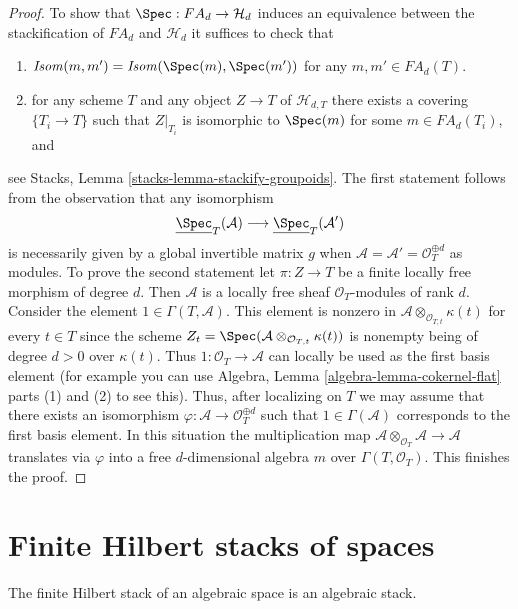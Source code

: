 \begin{proof}
\medskip\noindent
To show that $\Spec : FA_d \to \mathcal{H}_d$ induces an equivalence
between the stackification of $FA_d$ and $\mathcal{H}_d$ it suffices to
check that
\begin{enumerate}
\item $\mathit{Isom}(m, m') = \mathit{Isom}(\Spec(m), \Spec(m'))$
for any $m, m' \in FA_d(T)$.
\item for any scheme $T$ and any object $Z \to T$ of $\mathcal{H}_{d, T}$
there exists a covering $\{T_i \to T\}$ such that $Z|_{T_i}$ is
isomorphic to $\Spec(m)$ for some $m \in FA_d(T_i)$, and
\end{enumerate}
see
Stacks, Lemma \ref{stacks-lemma-stackify-groupoids}.
The first statement follows from the observation that any isomorphism
$$
\underline{\Spec}_T(\mathcal{A})
\longrightarrow
\underline{\Spec}_T(\mathcal{A}')
$$
is necessarily given by a global invertible matrix $g$ when
$\mathcal{A} = \mathcal{A}' = \mathcal{O}_T^{\oplus d}$ as modules.
To prove the second statement let $\pi : Z \to T$ be a finite
locally free morphism of degree $d$. Then $\mathcal{A}$ is a locally
free sheaf $\mathcal{O}_T$-modules of rank $d$.
Consider the element $1 \in \Gamma(T, \mathcal{A})$. This element is
nonzero in $\mathcal{A} \otimes_{\mathcal{O}_{T, t}} \kappa(t)$
for every $t \in T$ since the scheme
$Z_t = \Spec(\mathcal{A} \otimes_{\mathcal{O}_{T, t}} \kappa(t))$
is nonempty being of degree $d > 0$ over $\kappa(t)$. Thus
$1 : \mathcal{O}_T \to \mathcal{A}$ can locally be used as the first
basis element (for example you can use
Algebra, Lemma \ref{algebra-lemma-cokernel-flat} parts (1) and (2)
to see this). Thus, after localizing on
$T$ we may assume that there exists an isomorphism
$\varphi : \mathcal{A} \to \mathcal{O}_T^{\oplus d}$
such that $1 \in \Gamma(\mathcal{A})$ corresponds to the first basis element.
In this situation the multiplication map
$\mathcal{A} \otimes_{\mathcal{O}_T} \mathcal{A} \to \mathcal{A}$
translates via $\varphi$ into a free $d$-dimensional algebra $m$ over
$\Gamma(T, \mathcal{O}_T)$. This finishes the proof.
\end{proof}




\section{Finite Hilbert stacks of spaces}
\label{section-spaces-hilbert}

\noindent
The finite Hilbert stack of an algebraic space is an algebraic stack.

